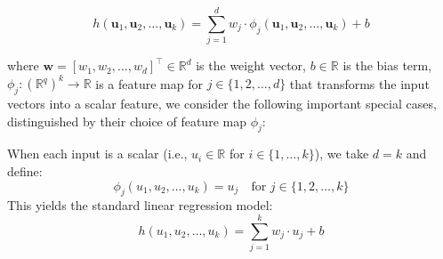 \documentclass[10pt]{article} %
\begin{document}
\begin{equation}
        h(\mathbf{u}_1, \mathbf{u}_2, \ldots, \mathbf{u}_k) = \sum_{j=1}^{d} w_j \cdot \phi_j(\mathbf{u}_1, \mathbf{u}_2, \ldots, \mathbf{u}_k) + b
    \end{equation}

where $\mathbf{w} = [w_1, w_2, \ldots, w_d]^{\top} \in \mathbb{R}^{d}$ is the weight vector, $b \in \mathbb{R}$ is the bias term, $\phi_j: (\mathbb{R}^{q})^k \to \mathbb{R}$ is a feature map for $j \in \{1, 2, \ldots, d\}$ that transforms the input vectors into a scalar feature, we consider the following important special cases, distinguished by their choice of feature map $\phi_j$:

\begin{definition}[Linear class, $q=1$]
    When each input is a scalar (i.e., $u_i \in \mathbb{R}$ for $i \in \{1, \ldots, k\}$), we take $d = k$ and define:
        \begin{equation}
            \phi_j(u_1, u_2, \ldots, u_k) = u_j \quad \text{for } j \in \{1, 2, \ldots, k\}
        \end{equation}
        This yields the standard linear regression model:
        \begin{equation}
            h(u_1, u_2, \ldots, u_k) = \sum_{j=1}^{k} w_j \cdot u_j + b
        \end{equation}
\end{definition}
\end{document}
